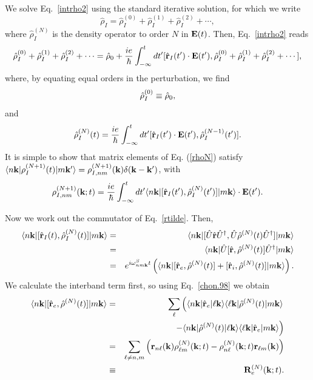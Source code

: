 \documentclass[floatfix,prb,aps,superscriptaddress,11pt,preprint]{revtex4}
\begin{document}
We solve Eq.~\eqref{intrho2} using the standard iterative
solution, for which we write
\begin{equation}\label{rhop}
\hat\rho_I=\hat\rho_I^{(0)}+\hat\rho_I^{(1)}+\hat\rho_I^{(2)}+\cdots
,
\end{equation}
where $\hat\rho_I^{(N)}$ is the density operator to order $N$ in $\mathbf{E}(t)$.
Then, Eq.~\eqref{intrho2} reads
\begin{equation}\label{intrho3}
\hat\rho_I^{(0)}+\hat\rho_I^{(1)}+\hat\rho_I^{(2)}+\cdots
=\hat{{\rho}}_0
+
\frac{ie}{\hbar}\int_{-\infty}^t dt'[\hat{\mathbf{r}}_I(t')\cdot\mathbf{E}(t'),
\hat\rho_I^{(0)}+\hat\rho_I^{(1)}+\hat\rho_I^{(2)}+\cdots
]
,
\end{equation}
where, by equating equal orders in the perturbation, we find
\begin{equation}\label{rho0}
\hat{{\rho}}_I^{(0)}\equiv\hat{{\rho}}_0
,
\end{equation}
and
\begin{equation}\label{rhoN}
\hat{{\rho}}_I^{(N)}(t)=
\frac{ie}{\hbar}
\int_{-\infty}^t dt'[\hat{\mathbf{r}}_I(t')\cdot\mathbf{E}(t'),\hat{{\rho}}^{(N-1)}_I(t')].
\end{equation}
It is simple to show that matrix elements of Eq. (\ref{rhoN}) satisfy
$\langle n\mathbf{k} |{\rho}_I^{(N+1)}(t)| m\mathbf{k}' \rangle={\rho}^{(N+1)}_{I,nm}(\mathbf{k})\delta(\mathbf{k}-\mathbf{k}')$,
with
\begin{equation}\label{rtilde}
{\rho}^{(N+1)}_{I,nm}(\mathbf{k};t)
=\frac{ie}{\hbar}\int_{-\infty}^t dt'
\langle n\mathbf{k} |
[\hat{\mathbf{r}}_I(t'),\hat{{\rho}}^{(N)}_I(t')]
| m\mathbf{k} \rangle
\cdot\mathbf{E}(t')
.
\end{equation}

Now we work out the commutator of Eq.~\eqref{rtilde}. Then,
\begin{eqnarray}\label{conmu1}
\langle n\mathbf{k} |
[\hat{\mathbf{r}}_I(t),\hat{{\rho}}^{(N)}_I(t)]
| m\mathbf{k} \rangle
&=&
\langle n\mathbf{k} |
[\hat{U}\hat{\mathbf{r}}\hat{U}^\dagger,\hat{U}\hat{{\rho}}^{(N)}(t)\hat{U}^\dagger]
| m\mathbf{k} \rangle
\nonumber \\
&=&
\langle n\mathbf{k} |
\hat{U}[\hat{\mathbf{r}},\hat{{\rho}}^{(N)}(t)]\hat{U}^\dagger
| m\mathbf{k} \rangle
\\
&=&
e^{i\omega^S_{nm\mathbf{k}}t}
\left(
\langle n\mathbf{k} |
[\hat{\mathbf{r}}_e,\hat{{\rho}}^{(N)}(t)]
+
[\hat{\mathbf{r}}_i,\hat{{\rho}}^{(N)}(t)]
| m\mathbf{k} \rangle
\right)
\nonumber
.
\end{eqnarray}
We calculate the interband term first, so using Eq.~\eqref{chon.98} we obtain
\begin{eqnarray}\label{conmu2}
\langle n\mathbf{k} |
[\hat{\mathbf{r}}_e,\hat{{\rho}}^{(N)}(t)]
| m\mathbf{k} \rangle
&=&
\sum_{\ell}
\left(
\langle n\mathbf{k} |
\hat{\mathbf{r}}_e
| \ell\mathbf{k} \rangle
\langle \ell\mathbf{k} |
\hat{{\rho}}^{(N)}(t)
| m\mathbf{k} \rangle
\right.
\nonumber \\
&&
\left.
-
\langle n\mathbf{k} |
\hat{{\rho}}^{(N)}(t)
| \ell\mathbf{k} \rangle
\langle \ell\mathbf{k} |
\hat{\mathbf{r}}_e
| m\mathbf{k} \rangle
\right)
\nonumber \\
&=&
\sum_{\ell\ne n,m}
\left(
\mathbf{r}_{n\ell}(\mathbf{k})
{\rho}^{(N)}_{\ell m}(\mathbf{k};t)
-
{\rho}^{(N)}_{n\ell}(\mathbf{k};t)
\mathbf{r}_{\ell m}(\mathbf{k})
\right)
\nonumber\\
&\equiv&
\mathbf{R}^{(N)}_e(\mathbf{k};t)
.
\end{eqnarray}
\end{document}
